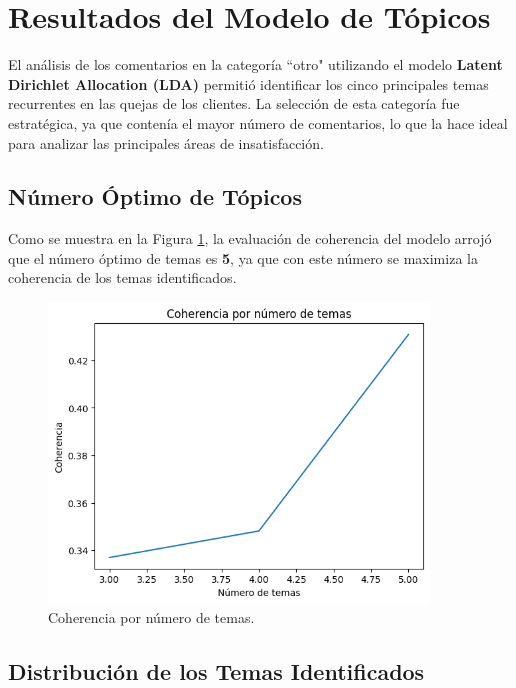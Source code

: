 \documentclass{matematicasud}
\begin{document}
\newpage
\section{Resultados del Modelo de Tópicos}

El análisis de los comentarios en la categoría ``otro" utilizando el modelo \textbf{Latent Dirichlet Allocation (LDA)} permitió identificar los cinco principales temas recurrentes en las quejas de los clientes. La selección de esta categoría fue estratégica, ya que contenía el mayor número de comentarios, lo que la hace ideal para analizar las principales áreas de insatisfacción.

\subsection{Número Óptimo de Tópicos}

Como se muestra en la Figura \ref{fig:coherencia_temas}, la evaluación de coherencia del modelo arrojó que el número óptimo de temas es \textbf{5}, ya que con este número se maximiza la coherencia de los temas identificados.

\begin{figure}[H]
    \centering
    \includegraphics[width=0.9\textwidth]{imagec.png} %
    \caption{Coherencia por número de temas.}
    \label{fig:coherencia_temas}
\end{figure}

\subsection{Distribución de los Temas Identificados}
\end{document}
